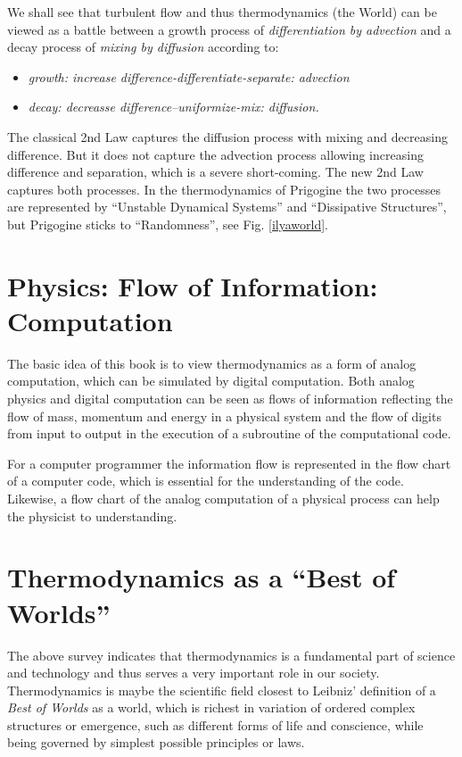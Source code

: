 We shall see that turbulent flow and thus thermodynamics (the World)  
can be viewed as a battle between a growth process of \emph{differentiation
by advection} and a decay process of \emph{mixing by diffusion} according
to:
\begin{itemize}
\item \emph{growth: increase difference-differentiate-separate: advection}
\item \emph{decay: decreasse difference--uniformize-mix: diffusion.}
\end{itemize} 
The classical 2nd Law captures the diffusion process with mixing
and decreasing difference. But it does not capture the 
advection process allowing increasing difference and separation,
which is a severe short-coming. The new 2nd Law captures
both processes. In the thermodynamics of Prigogine the two processes are
represented  by ``Unstable Dynamical Systems'' and ``Dissipative Structures'',
but Prigogine sticks to ``Randomness'', see Fig. \ref{ilyaworld}.


\section{Physics: Flow of Information: Computation}

The basic idea of this book 
is to view thermodynamics as a form of 
analog computation, which can be simulated by digital computation. 
Both analog physics and digital computation can be seen as  
flows of information reflecting the flow of mass, momentum and 
energy in a physical system and the flow of digits from input to output in the
execution of a subroutine of the computational code.

For a computer programmer the information flow is 
represented in the flow chart of a computer code, which
is essential for the understanding of the code. 
Likewise, a flow chart of the analog computation 
of a physical process can help the physicist 
to understanding.



 
\section{Thermodynamics as a ``Best of  Worlds''}

The above survey indicates that thermodynamics 
is a fundamental part of science and
technology and thus serves a very important role in our society.
Thermodynamics is maybe the scientific field closest to 
Leibniz' definition of a \emph{Best of Worlds}
as a world, which is richest in variation of ordered complex
structures or emergence, such as different forms of life and conscience,
while being governed by simplest possible principles or laws.



